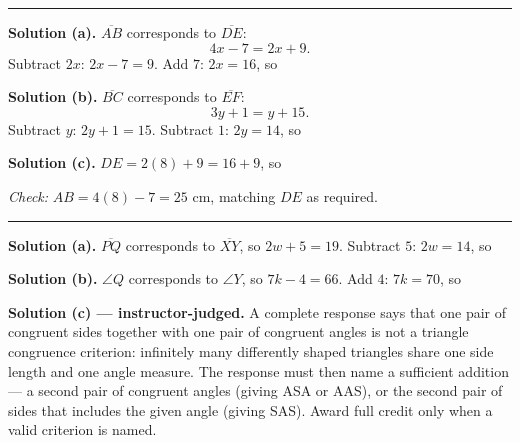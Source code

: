 \documentclass[12pt]{article}
\begin{document}
\vspace{0.2cm}\noindent\rule{\linewidth}{0.2pt}


\noindent\textbf{Solution (a).} $\overline{AB}$ corresponds to $\overline{DE}$:
\[ 4x - 7 = 2x + 9 .\]
Subtract $2x$: $2x - 7 = 9$. Add $7$: $2x = 16$, so 

\noindent\textbf{Solution (b).} $\overline{BC}$ corresponds to $\overline{EF}$:
\[ 3y + 1 = y + 15 .\]
Subtract $y$: $2y + 1 = 15$. Subtract $1$: $2y = 14$, so 

\noindent\textbf{Solution (c).} $DE = 2(8) + 9 = 16 + 9$, so

\noindent\textit{Check:} $AB = 4(8) - 7 = 25$ cm, matching $DE$ as required.

\vspace{0.2cm}\noindent\rule{\linewidth}{0.2pt}


\noindent\textbf{Solution (a).} $\overline{PQ}$ corresponds to $\overline{XY}$,
so $2w + 5 = 19$. Subtract $5$: $2w = 14$, so 

\noindent\textbf{Solution (b).} $\angle Q$ corresponds to $\angle Y$, so
$7k - 4 = 66$. Add $4$: $7k = 70$, so 

\noindent\textbf{Solution (c) --- instructor-judged.} A complete response says
that one pair of congruent sides together with one pair of congruent angles is
not a triangle congruence criterion: infinitely many differently shaped
triangles share one side length and one angle measure. The response must then
name a sufficient addition --- a second pair of congruent angles (giving ASA or
AAS), or the second pair of sides that includes the given angle (giving SAS).
Award full credit only when a valid criterion is named.
\end{document}
